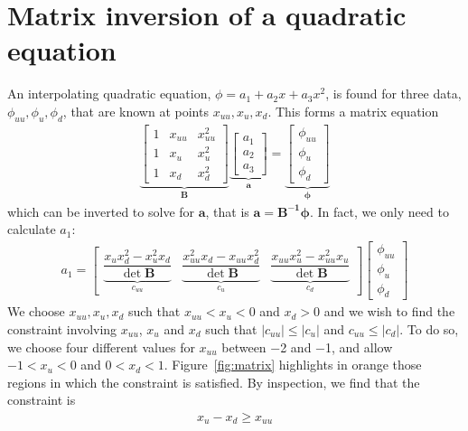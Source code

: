 \documentclass{article}
\newcommand{\vect}{\bm}
\begin{document}
\section{Matrix inversion of a quadratic equation}
\label{sec:matrix}
An interpolating quadratic equation, $\phi = a_1 + a_2 x + a_3 x^2$, is found for three data, $\phi_{uu}, \phi_{u}, \phi_{d}$, that are known at points $x_{uu}, x_{u}, x_{d}$.  This forms a matrix equation
\begin{align}
\underbrace{
\begin{bmatrix}
1 & x_{uu} & x_{uu}^2 \\
1 & x_u & x_u^2 \\
1 & x_d & x_d^2
\end{bmatrix}}_{\vect{B}}
\underbrace{
\begin{bmatrix}
a_1 \\
a_2 \\
a_3
\end{bmatrix}}_{\vect{a}}
= 
\underbrace{
\begin{bmatrix}
\phi_{uu} \\
\phi_{u} \\
\phi_{d}
\end{bmatrix}
}_{\vect{\phi}}
\end{align}
which can be inverted to solve for $\vect{a}$, that is $\vect{a} = \vect{B^{-1}} \vect{\phi}$.
In fact, we only need to calculate $a_1$:
\begin{align}
a_1 = 
\begin{bmatrix}
\underbrace{\dfrac{x_u x_d^2 - x_u^2 x_d}{\det \vect{B}}}_{c_{uu}} &
\underbrace{\dfrac{x_{uu}^2 x_d - x_{uu} x_d^2}{\det \vect{B}}}_{c_u} &
\underbrace{\dfrac{x_{uu} x_u^2 - x_{uu}^2 x_u}{\det \vect{B}}}_{c_d}
\end{bmatrix}
\begin{bmatrix}
\phi_{uu} \\
\phi_{u} \\
\phi_{d}
\end{bmatrix}
\end{align}
We choose $x_{uu}, x_u, x_d$ such that $x_{uu} < x_u < 0$ and $x_d > 0$ and we wish to find the constraint involving $x_{uu}$, $x_u$ and $x_d$ such that $|c_{uu}| \leq |c_u|$ and $c_{uu} \leq |c_d|$.
To do so, we choose four different values for $x_{uu}$ between \num{-2} and \num{-1}, and allow $-1 < x_u < 0$ and $0 < x_d < 1$.  Figure~\ref{fig:matrix} highlights in orange those regions in which the constraint is satisfied.  By inspection, we find that the constraint is
\begin{align}
	x_u - x_d \geq x_{uu} \label{eqn:matrix-constraint}
\end{align}
\end{document}
